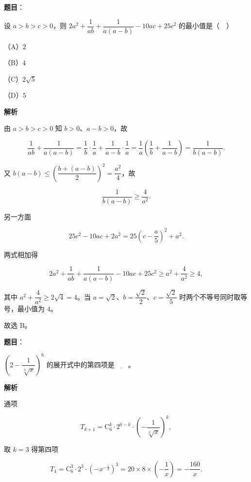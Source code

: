 \begin{answer}

\textbf{题目}：

设 $a>b>c>0$，则 $2a^2+\dfrac{1}{ab}+\dfrac{1}{a(a-b)}-10ac+25c^2$ 的最小值是（　）

（A）$2$

（B）$4$

（C）$2\sqrt5$

（D）$5$

\textbf{解析}

由 $a>b>c>0$ 知 $b>0$、$a-b>0$，故

\nopagebreak[4]
\[\frac1{ab}+\frac1{a(a-b)}=\frac1b\cdot\frac1a+\frac1{a-b}\cdot\frac1a=\frac1a\left(\frac1b+\frac1{a-b}\right)=\frac{1}{b(a-b)}.\]

又 $b(a-b)\leqslant\left(\dfrac{b+(a-b)}2\right)^2=\dfrac{a^2}4$，故

\nopagebreak[4]
\[\frac{1}{b(a-b)}\geqslant\frac{4}{a^2}.\]

另一方面

\nopagebreak[4]
\[25c^2-10ac+2a^2=25\left(c-\frac a5\right)^2+a^2.\]

两式相加得

\nopagebreak[4]
\[2a^2+\frac1{ab}+\frac1{a(a-b)}-10ac+25c^2\geqslant a^2+\frac4{a^2}\geqslant4,\]

其中 $a^2+\dfrac4{a^2}\geqslant2\sqrt4=4$。当 $a=\sqrt2$、$b=\dfrac{\sqrt2}2$、$c=\dfrac{\sqrt2}5$ 时两个不等号同时取等号，最小值为 $4$。

故选 B。


\end{answer}
\begin{answer}

\textbf{题目}：

$\left(2-\dfrac{1}{\sqrt[3]{x}}\right)^6$ 的展开式中的第四项是$\underline{\qquad}$。

\textbf{解析}

通项

\nopagebreak[4]
\[T_{k+1}=\mathrm C_6^k\cdot2^{6-k}\cdot\left(-\frac1{\sqrt[3]x}\right)^k,\]

取 $k=3$ 得第四项

\nopagebreak[4]
\[T_4=\mathrm C_6^3\cdot2^3\cdot\left(-x^{-\frac13}\right)^3=20\times8\times\left(-\frac1x\right)=-\frac{160}{x}.\]


\end{answer}
